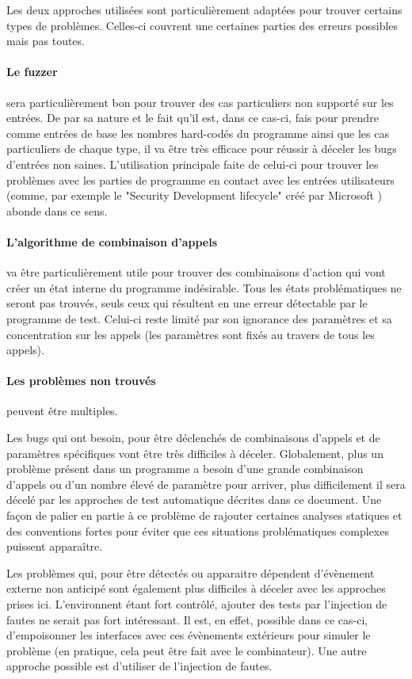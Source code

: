 \documentclass[a4paper]{report}
\begin{document}
Les deux approches utilisées sont particulièrement adaptées pour trouver certains types de problèmes.
Celles-ci couvrent une certaines parties des erreurs possibles mais pas toutes.

\paragraph{Le fuzzer} sera particulièrement bon pour trouver des cas particuliers non supporté sur les entrées.
De par sa nature et le fait qu'il est, dans ce cas-ci, fais pour prendre comme entrées de base les nombres hard-codés du programme ainsi que les cas particuliers de chaque type, il va être très efficace pour réussir à déceler les bugs d'entrées non saines.
L'utilisation principale faite de celui-ci pour trouver les problèmes avec les parties de programme en contact avec les entrées utilisateurs (comme, par exemple le "Security Development lifecycle" créé par Microsoft \cite{howard2006security}) abonde dans ce sens.

\paragraph{L'algorithme de combinaison d'appels} va être particulièrement utile pour trouver des combinaisons d'action qui vont créer un état interne du programme indésirable.
Tous les états problématiques ne seront pas trouvés, seuls ceux qui résultent en une erreur détectable par le programme de test.
Celui-ci reste limité par son ignorance des paramètres et sa concentration sur les appels (les paramètres sont fixés au travers de tous les appels).

\paragraph{Les problèmes non trouvés} peuvent être multiples.

Les bugs qui ont besoin, pour être déclenchés de combinaisons d'appels et de paramètres spécifiques vont être très difficiles à déceler.
Globalement, plus un problème présent dans un programme a besoin d'une grande combinaison d'appels ou d'un nombre élevé de paramètre pour arriver, plus difficilement il sera décelé par les approches de test automatique décrites dans ce document.
Une façon de palier en partie à ce problème de rajouter certaines analyses statiques et des conventions fortes pour éviter que ces situations problématiques complexes puissent apparaître.

Les problèmes qui, pour être détectés ou apparaitre dépendent d'évènement externe non anticipé sont également plus difficiles à déceler avec les approches prises ici.
L'environnent étant fort contrôlé, ajouter des tests par l'injection de fautes ne serait pas fort intéressant.
Il est, en effet, possible dans ce cas-ci, d'empoisonner les interfaces avec ces évènements extérieurs pour simuler le problème (en pratique, cela peut être fait avec le combinateur).
Une autre approche possible est d'utiliser de l'injection de fautes.
\end{document}
